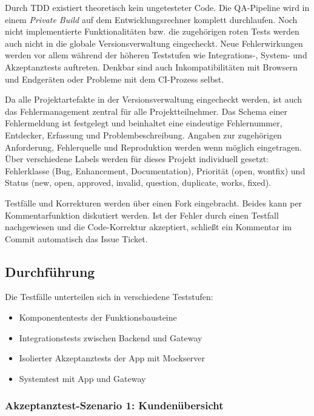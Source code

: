 Durch \ac{TDD} existiert theoretisch kein ungetesteter Code. Die QA-Pipeline wird in einem \textit{Private Build} auf dem Entwicklungsrechner komplett durchlaufen. Noch nicht implementierte Funktionalitäten bzw. die zugehörigen roten Tests werden auch nicht in die globale Versionsverwaltung eingecheckt. Neue Fehlerwirkungen werden vor allem während der höheren Teststufen wie Integrations-, System- und Akzeptanztests auftreten. Denkbar sind auch Inkompatibilitäten mit Browsern und Endgeräten oder Probleme mit dem CI-Prozess selbst.

 Da alle Projektartefakte in der Versionsverwaltung eingecheckt werden, ist auch das Fehlermanagement zentral für alle Projektteilnehmer. Das Schema einer Fehlermeldung ist festgelegt und beinhaltet eine eindeutige Fehlernummer, Entdecker, Erfassung und Problembeschreibung. Angaben zur zugehörigen Anforderung, Fehlerquelle und Reproduktion werden wenn möglich eingetragen. Über verschiedene Labels werden für dieses Projekt individuell gesetzt: Fehlerklasse (Bug, Enhancement, Documentation), Priorität (open, wontfix) und Status (new, open, approved, invalid, question, duplicate, works, fixed).

Testfälle und Korrekturen werden über einen Fork eingebracht. Beides kann per Kommentarfunktion diskutiert werden. Ist der Fehler durch einen Testfall nachgewiesen und die Code-Korrektur akzeptiert, schließt ein Kommentar im Commit automatisch das Issue Ticket.


\subsection{Durchführung}
\label{sec:tests}
Die Testfälle unterteilen sich in verschiedene Teststufen:
\begin{itemize}
	\item Komponententests der Funktionsbausteine
	\item Integrationstests zwischen Backend und Gateway
	\item Isolierter Akzeptanztests der App mit Mockserver
	\item Systemtest mit App und Gateway
\end{itemize}

\subsubsection{Akzeptanztest-Szenario 1: Kundenübersicht}


